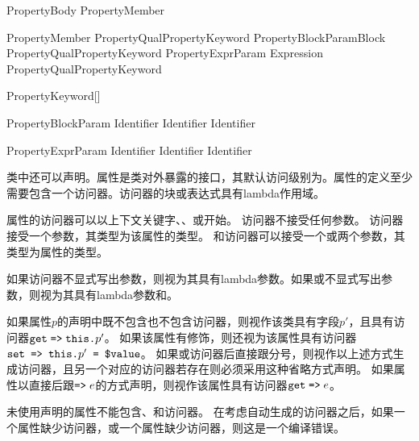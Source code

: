 \begin{bnf}{PropertyBody}
    \terminal{\{} PropertyMember\bnfp \terminal{\}}
\end{bnf}

\begin{bnf}{PropertyMember}
    PropertyQual\bnfs PropertyKeyword PropertyBlockParam\bnfq Block \br
    PropertyQual\bnfs PropertyKeyword PropertyExprParam\bnfq \terminal{=>} Expression \terminal{;} \br
    PropertyQual\bnfs PropertyKeyword \terminal{;}
\end{bnf}

\begin{bnf}{PropertyKeyword}[\oneof]
\end{bnf}

\begin{bnf}{PropertyBlockParam}
    Identifier \br
    Identifier \terminal{,} Identifier
\end{bnf}

\begin{bnf}{PropertyExprParam}
    Identifier \br
    \terminal{(} Identifier \terminal{,} Identifier \terminal{)}
\end{bnf}

\pnum
类中还可以声明。属性是类对外暴露的接口，其默认访问级别为。属性的定义至少需要包含一个访问器。访问器的块或表达式具有lambda作用域。

\pnum
属性的访问器可以以上下文关键字、、或开始。
访问器不接受任何参数。
访问器接受一个参数，其类型为该属性的类型。
和访问器可以接受一个或两个参数，其类型为属性的类型。

\pnum
如果访问器不显式写出参数，则视为其具有lambda参数。如果或不显式写出参数，则视为其具有lambda参数和。

\pnum
如果属性$p$的声明中既不包含也不包含访问器，则视作该类具有字段$p'$，且具有访问器$\texttt{get}\mathrel{\texttt{=>}}\texttt{this.}p'$。
如果该属性有修饰，则还视为该属性具有访问器$\texttt{set => this.}p'\texttt{ = \$value}$。
如果或访问器后直接跟分号，则视作以上述方式生成访问器，且另一个对应的访问器若存在则必须采用这种省略方式声明。
如果属性以直接后跟$\mathrel{\texttt{=>}}e$的方式声明，则视作该属性具有访问器$\texttt{get} \mathrel{\texttt{=>}} e$。

\pnum
未使用声明的属性不能包含、和访问器。
在考虑自动生成的访问器之后，如果一个属性缺少访问器，或一个属性缺少访问器，则这是一个编译错误。

